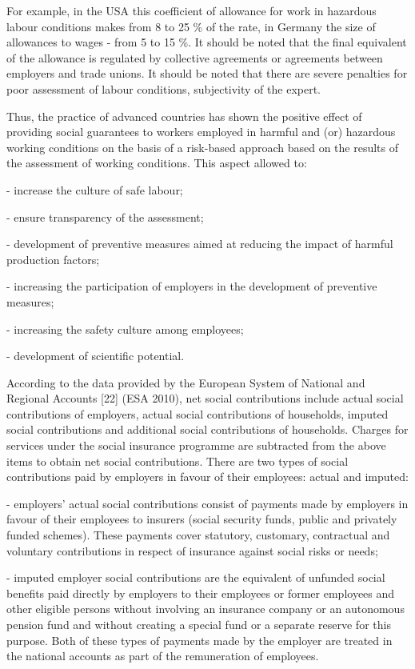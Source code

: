 For example, in the USA this coefficient of allowance for work in
hazardous labour conditions makes from 8 to 25 \% of the rate, in
Germany the size of allowances to wages - from 5 to 15 \%. It should be
noted that the final equivalent of the allowance is regulated by
collective agreements or agreements between employers and trade unions.
It should be noted that there are severe penalties for poor assessment
of labour conditions, subjectivity of the expert.

Thus, the practice of advanced countries has shown the positive effect
of providing social guarantees to workers employed in harmful and (or)
hazardous working conditions on the basis of a risk-based approach based
on the results of the assessment of working conditions. This aspect
allowed to:

- increase the culture of safe labour;

- ensure transparency of the assessment;

- development of preventive measures aimed at reducing the impact of
harmful production factors;

- increasing the participation of employers in the development of
preventive measures;

- increasing the safety culture among employees;

- development of scientific potential.

According to the data provided by the European System of National and
Regional Accounts {[}22{]} (ESA 2010), net social contributions include
actual social contributions of employers, actual social contributions of
households, imputed social contributions and additional social
contributions of households. Charges for services under the social
insurance programme are subtracted from the above items to obtain net
social contributions. There are two types of social contributions paid
by employers in favour of their employees: actual and imputed:

- employers'{} actual social contributions consist of
payments made by employers in favour of their employees to insurers
(social security funds, public and privately funded schemes). These
payments cover statutory, customary, contractual and voluntary
contributions in respect of insurance against social risks or needs;

- imputed employer social contributions are the equivalent of unfunded
social benefits paid directly by employers to their employees or former
employees and other eligible persons without involving an insurance
company or an autonomous pension fund and without creating a special
fund or a separate reserve for this purpose. Both of these types of
payments made by the employer are treated in the national accounts as
part of the remuneration of employees.

